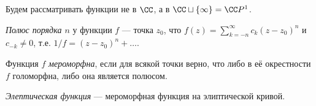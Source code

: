 \documentclass[12pt,a4paper]{article}
\begin{document}
    Будем рассматривать функции не в $\CC$, а в $\CC \sqcup \{\infty\} = \CC P^1$.

    \begin{definition}
        \emph{Полюс порядка $n$} у функции $f$ --- точка $z_0$, что $f(z) = \sum_{k=-n}^\infty c_k (z - z_0)^n$ и $c_{-k} \neq 0$, т.е. $1/f = (z - z_0)^n + \dots$. 
    \end{definition}

    \begin{definition}
        Функция $f$ \emph{мероморфна}, если для всякой точки верно, что либо в её окрестности $f$ голоморфна, либо она является полюсом.
    \end{definition}

    \begin{definition}
        \emph{Элептическая функция} --- мероморфная функция на элиптической кривой.
    \end{definition}
\end{document}
